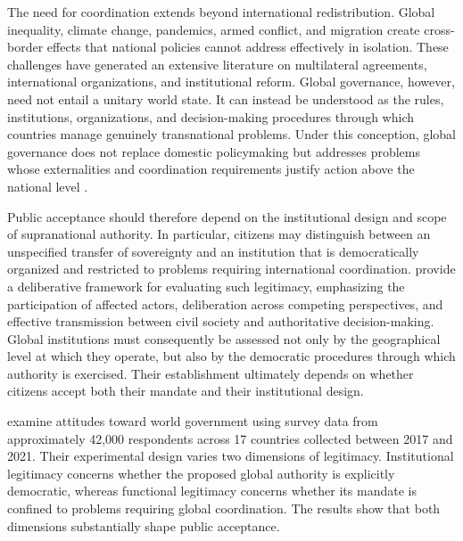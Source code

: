 \documentclass[11pt,a4paper]{article}
\begin{document}
The need for coordination extends beyond international redistribution. Global inequality, climate change, pandemics, armed conflict, and migration create cross-border effects that national policies cannot address effectively in isolation. These challenges have generated an extensive literature on multilateral agreements, international organizations, and institutional reform. Global governance, however, need not entail a unitary world state. It can instead be understood as the rules, institutions, organizations, and decision-making procedures through which countries manage genuinely transnational problems. Under this conception, global governance does not replace domestic policymaking but addresses problems whose externalities and coordination requirements justify action above the national level \citep{ghassim_who_2024,dryzek_global_2011}.

Public acceptance should therefore depend on the institutional design and scope of supranational authority. In particular, citizens may distinguish between an unspecified transfer of sovereignty and an institution that is democratically organized and restricted to problems requiring international coordination. \citet{dryzek_global_2011} provide a deliberative framework for evaluating such legitimacy, emphasizing the participation of affected actors, deliberation across competing perspectives, and effective transmission between civil society and authoritative decision-making. Global institutions must consequently be assessed not only by the geographical level at which they operate, but also by the democratic procedures through which authority is exercised. Their establishment ultimately depends on whether citizens accept both their mandate and their institutional design.

\citet{ghassim_who_2024} examine attitudes toward world government using survey data from approximately 42,000 respondents across 17 countries collected between 2017 and 2021. %
Their experimental design varies two dimensions of legitimacy. Institutional legitimacy concerns whether the proposed global authority is explicitly democratic, whereas functional legitimacy concerns whether its mandate is confined to problems requiring global coordination. The results show that both dimensions substantially shape %
public acceptance.
\end{document}
